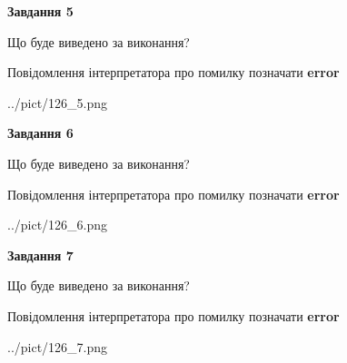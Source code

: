 \documentclass[10pt, ukrainian]{article}
\begin{document}
{\begin {large}
{\begin {center}\textbf{Завдання 5}\end {center}}\par
Що буде виведено за виконання? \par
Повідомлення інтерпретатора про помилку позначати \textbf{error}

\begin{center}
	{../pict/126_5.png}
\end{center}
\newpage

{\begin {center}\textbf{Завдання 6}\end {center}}\par
Що буде виведено за виконання? \par
Повідомлення інтерпретатора про помилку позначати \textbf{error}

\begin{center}
	{../pict/126_6.png}
\end{center}
\newpage

{\begin {center}\textbf{Завдання 7}\end {center}}\par
Що буде виведено за виконання? \par
Повідомлення інтерпретатора про помилку позначати \textbf{error}

\begin{center}
	{../pict/126_7.png}
\end{center}
\newpage

\end {large}}
\end{document}
